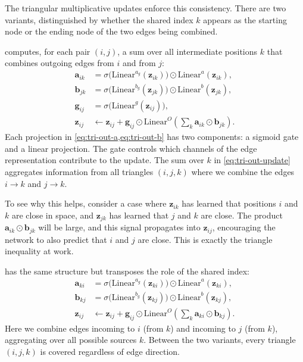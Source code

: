 The triangular multiplicative updates enforce this consistency.
There are two variants, distinguished by whether the shared index $k$ appears as the starting node or the ending node of the two edges being combined.

 computes, for each pair $(i,j)$, a sum over all intermediate positions $k$ that combines outgoing edges from $i$ and from $j$:
\begin{align}
\bm{a}_{ik} &= \sigma\!\bigl(\text{Linear}^{a_g}(\bm{z}_{ik})\bigr) \odot \text{Linear}^a(\bm{z}_{ik}), \label{eq:tri-out-a} \\
\bm{b}_{jk} &= \sigma\!\bigl(\text{Linear}^{b_g}(\bm{z}_{jk})\bigr) \odot \text{Linear}^b(\bm{z}_{jk}), \label{eq:tri-out-b} \\
\bm{g}_{ij} &= \sigma\!\bigl(\text{Linear}^g(\bm{z}_{ij})\bigr), \label{eq:tri-out-gate} \\
\bm{z}_{ij} &\leftarrow \bm{z}_{ij} + \bm{g}_{ij} \odot \text{Linear}^O\!\left(\sum_k \bm{a}_{ik} \odot \bm{b}_{jk}\right). \label{eq:tri-out-update}
\end{align}
Each projection in \cref{eq:tri-out-a,eq:tri-out-b} has two components: a sigmoid gate and a linear projection.
The gate controls which channels of the edge representation contribute to the update.
The sum over $k$ in \cref{eq:tri-out-update} aggregates information from all triangles $(i, j, k)$ where we combine the edges $i \to k$ and $j \to k$.

To see why this helps, consider a case where $\bm{z}_{ik}$ has learned that positions $i$ and $k$ are close in space, and $\bm{z}_{jk}$ has learned that $j$ and $k$ are close.
The product $\bm{a}_{ik} \odot \bm{b}_{jk}$ will be large, and this signal propagates into $\bm{z}_{ij}$, encouraging the network to also predict that $i$ and $j$ are close.
This is exactly the triangle inequality at work.

 has the same structure but transposes the role of the shared index:
\begin{align}
\bm{a}_{ki} &= \sigma\!\bigl(\text{Linear}^{a_g}(\bm{z}_{ki})\bigr) \odot \text{Linear}^a(\bm{z}_{ki}), \label{eq:tri-in-a} \\
\bm{b}_{kj} &= \sigma\!\bigl(\text{Linear}^{b_g}(\bm{z}_{kj})\bigr) \odot \text{Linear}^b(\bm{z}_{kj}), \label{eq:tri-in-b} \\
\bm{z}_{ij} &\leftarrow \bm{z}_{ij} + \bm{g}_{ij} \odot \text{Linear}^O\!\left(\sum_k \bm{a}_{ki} \odot \bm{b}_{kj}\right). \label{eq:tri-in-update}
\end{align}
Here we combine edges incoming to $i$ (from $k$) and incoming to $j$ (from $k$), aggregating over all possible sources $k$.
Between the two variants, every triangle $(i, j, k)$ is covered regardless of edge direction.

